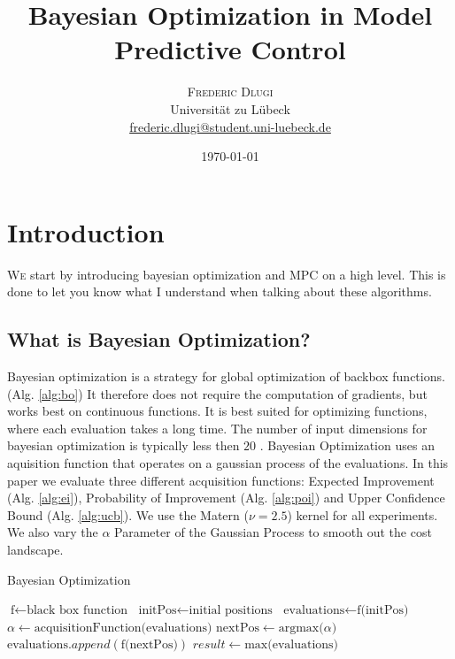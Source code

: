 \documentclass[twoside,twocolumn]{article}
\title{Bayesian Optimization in Model Predictive Control} %
\author{%
\textsc{Frederic Dlugi}\\[1ex] %
\normalsize Universität zu Lübeck \\ %
\normalsize \href{mailto:frederic.dlugi@student.uni-luebeck.de}{frederic.dlugi@student.uni-luebeck.de} %
}
\date{\today} %
\begin{document}
\maketitle


\section{Introduction}

\lettrine[nindent=0em,lines=3]{W} e start by introducing bayesian optimization and MPC on a high level.
This is done to let you know what I understand when talking about these algorithms.

\subsection{What is Bayesian Optimization?}
Bayesian optimization is a strategy for global optimization of backbox functions. (Alg. \ref{alg:bo})
It therefore does not require the computation of gradients, but works best on continuous functions.
It is best suited for optimizing functions, where each evaluation takes a long time.
The number of input dimensions for bayesian optimization is typically less then $20$ \cite{frazier2018tutorial}.
Bayesian Optimization uses an aquisition function that operates on a gaussian process of the evaluations. In this paper we evaluate three different acquisition functions: Expected Improvement (Alg. \ref{alg:ei}), Probability of Improvement (Alg. \ref{alg:poi}) and Upper Confidence Bound (Alg. \ref{alg:ucb}). We use the Matern ($\nu=2.5$) kernel for all experiments. We also vary the $\alpha$ Parameter of the Gaussian Process to smooth out the cost landscape.

\begin{algorithm}
    \caption{Bayesian Optimization}
    \label{alg:bo}
    \begin{algorithmic}
        \State $\text{f} \gets \text{black box function}$
        \State $\text{initPos} \gets \text{initial positions}$
        \State $\text{evaluations} \gets \text{f(initPos)}$
            \State $\alpha \gets \text{acquisitionFunction(evaluations)}$
            \State $\text{nextPos} \gets \text{argmax(}\alpha\text{)}$
            \State $\text{evaluations}.append(\text{f(nextPos)})$
        \EndFor
        \State $result \gets \text{max(evaluations)}$
    \end{algorithmic}
\end{algorithm}
\end{document}
